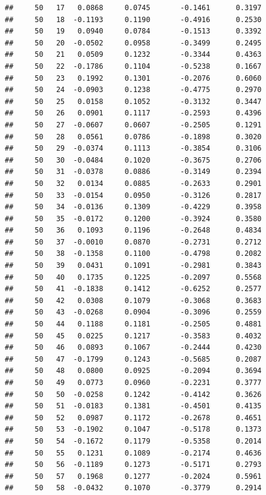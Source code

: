 \documentclass[
]{article}
\begin{document}
\begin{verbatim}
##     50   17   0.0868     0.0745       -0.1461      0.3197 
##     50   18  -0.1193     0.1190       -0.4916      0.2530 
##     50   19   0.0940     0.0784       -0.1513      0.3392 
##     50   20  -0.0502     0.0958       -0.3499      0.2495 
##     50   21   0.0509     0.1232       -0.3344      0.4363 
##     50   22  -0.1786     0.1104       -0.5238      0.1667 
##     50   23   0.1992     0.1301       -0.2076      0.6060 
##     50   24  -0.0903     0.1238       -0.4775      0.2970 
##     50   25   0.0158     0.1052       -0.3132      0.3447 
##     50   26   0.0901     0.1117       -0.2593      0.4396 
##     50   27  -0.0607     0.0607       -0.2505      0.1291 
##     50   28   0.0561     0.0786       -0.1898      0.3020 
##     50   29  -0.0374     0.1113       -0.3854      0.3106 
##     50   30  -0.0484     0.1020       -0.3675      0.2706 
##     50   31  -0.0378     0.0886       -0.3149      0.2394 
##     50   32   0.0134     0.0885       -0.2633      0.2901 
##     50   33  -0.0154     0.0950       -0.3126      0.2817 
##     50   34  -0.0136     0.1309       -0.4229      0.3958 
##     50   35  -0.0172     0.1200       -0.3924      0.3580 
##     50   36   0.1093     0.1196       -0.2648      0.4834 
##     50   37  -0.0010     0.0870       -0.2731      0.2712 
##     50   38  -0.1358     0.1100       -0.4798      0.2082 
##     50   39   0.0431     0.1091       -0.2981      0.3843 
##     50   40   0.1735     0.1225       -0.2097      0.5568 
##     50   41  -0.1838     0.1412       -0.6252      0.2577 
##     50   42   0.0308     0.1079       -0.3068      0.3683 
##     50   43  -0.0268     0.0904       -0.3096      0.2559 
##     50   44   0.1188     0.1181       -0.2505      0.4881 
##     50   45   0.0225     0.1217       -0.3583      0.4032 
##     50   46   0.0893     0.1067       -0.2444      0.4230 
##     50   47  -0.1799     0.1243       -0.5685      0.2087 
##     50   48   0.0800     0.0925       -0.2094      0.3694 
##     50   49   0.0773     0.0960       -0.2231      0.3777 
##     50   50  -0.0258     0.1242       -0.4142      0.3626 
##     50   51  -0.0183     0.1381       -0.4501      0.4135 
##     50   52   0.0987     0.1172       -0.2678      0.4651 
##     50   53  -0.1902     0.1047       -0.5178      0.1373 
##     50   54  -0.1672     0.1179       -0.5358      0.2014 
##     50   55   0.1231     0.1089       -0.2174      0.4636 
##     50   56  -0.1189     0.1273       -0.5171      0.2793 
##     50   57   0.1968     0.1277       -0.2024      0.5961 
##     50   58  -0.0432     0.1070       -0.3779      0.2914 

\end{verbatim}
\end{document}
